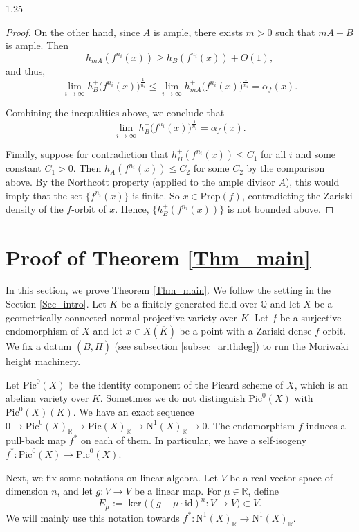 \documentclass[12pt]{amsart}
\newcommand{\mb}[1]{\mathbb{#1}}
\newcommand{\mr}[1]{\mathrm{#1}}
\newcommand\ra{\rightarrow}
\begin{document}
\begin{spacing}{1.25}
\begin{proof}
On the other hand, since $A$ is ample, there exists $m > 0$ such that $mA - B$ is ample. Then
\[
h_{mA}(f^{n_i}(x)) \geq h_B(f^{n_i}(x)) + O(1),
\]
and thus,
\[
\lim_{i \to \infty} h_B^+\big(f^{n_i}(x)\big)^{\frac{1}{n_i}} \leq \lim_{i \to \infty} h_{mA}^+\big(f^{n_i}(x)\big)^{\frac{1}{n_i}} = \alpha_f(x).
\]

Combining the inequalities above, we conclude that
\[
\lim_{i \to \infty} h_B^+\big(f^{n_i}(x)\big)^{\frac{1}{n_i}} = \alpha_f(x).
\]

Finally, suppose for contradiction that $h_B^+(f^{n_i}(x)) \leq C_1$ for all $i$ and some constant $C_1 > 0$. Then $h_A(f^{n_i}(x)) \leq C_2$ for some $C_2$ by the comparison above. By the Northcott property (applied to the ample divisor $A$), this would imply that the set $\{f^{n_i}(x)\}$ is finite. So $x\in \mr{Prep}(f)$, contradicting the Zariski density of the $f$-orbit of $x$. Hence, $\{h_B^+(f^{n_i}(x))\}$ is not bounded above.
\end{proof}










\section{Proof of Theorem \ref{Thm_main}}\label{Sec_proof}

In this section, we prove Theorem \ref{Thm_main}. We follow the setting in the Section \ref{Sec_intro}. Let $K$ be a finitely generated field over $\mathbb{Q}$ and let $X$ be a geometrically connected normal projective variety over $K$. Let $f$ be a surjective endomorphism of $X$ and let $x\in X(\overline{K})$ be a point with a Zariski dense $f$-orbit. We fix a datum $(B,\overline{H})$ (see subsection \ref{subsec_arithdeg}) to run the Moriwaki height machinery.

Let $\mathrm{Pic}^0(X)$ be the identity component of the Picard scheme of $X$, which is an abelian variety over $K$. Sometimes we do not distinguish $\mathrm{Pic}^0(X)$ with $\mathrm{Pic}^0(X)(K)$. We have an exact sequence $0\rightarrow\mathrm{Pic}^0(X)_{\mathbb{R}}\rightarrow\mathrm{Pic}(X)_{\mathbb{R}}\rightarrow\mathrm{N}^1(X)_{\mathbb{R}}\rightarrow 0$. The endomorphism $f$ induces a pull-back map $f^*$ on each of them. In particular, we have a self-isogeny $f^*:\mathrm{Pic}^0(X)\rightarrow\mathrm{Pic}^0(X)$.

Next, we fix some notations on linear algebra. Let $V$ be a real vector space of dimension $n$, and let $g: V\ra V$ be a linear map. For $\mu\in \mb{R}$, define 
\[E_\mu:=\ker\big((g-\mu\cdot\mr{id})^n:V\ra V\big)\subset V.\]
We will mainly use this notation towards $f^*:\mathrm{N}^1(X)_{\mathbb{R}}\ra\mathrm{N}^1(X)_{\mathbb{R}}$.


\end{spacing}
\end{document}
